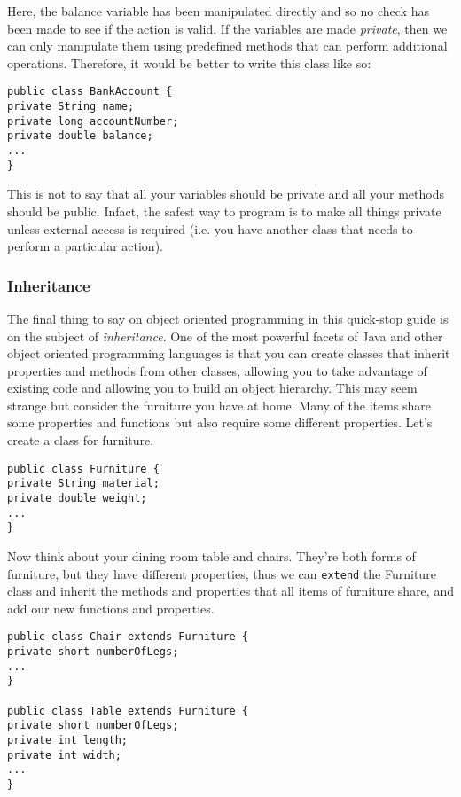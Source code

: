 \noindent
Here, the balance variable has been manipulated directly and so no check has been made to see if the action is valid. If the variables are made \emph{private}, then we can only manipulate them using predefined methods that can perform additional operations. Therefore, it would be better to write this class like so:

\begin{verbatim}
public class BankAccount {
private String name;
private long accountNumber;
private double balance;
...
}
\end{verbatim}

\noindent
This is not to say that all your variables should be private and all your methods should be public. Infact, the safest way to program is to make all things private unless external access is required (i.e. you have another class that needs to perform a particular action).

\subsubsection*{Inheritance}

The final thing to say on object oriented programming in this quick-stop guide is on the subject of \emph{inheritance}. One of the most powerful facets of Java and other object oriented programming languages is that you can create classes that inherit properties and methods from other classes, allowing you to take advantage of existing code and allowing you to build an object hierarchy. This may seem strange but consider the furniture you have at home. Many of the items share some properties and functions but also require some different properties. Let's create a class for furniture.

\begin{verbatim}
public class Furniture {
private String material;
private double weight;
...
}
\end{verbatim}

\noindent
Now think about your dining room table and chairs. They're both forms of furniture, but they have different properties, thus we can {\tt extend} the Furniture class and inherit the methods and properties that all items of furniture share, and add our new functions and properties.

\begin{verbatim}
public class Chair extends Furniture {
private short numberOfLegs;
...
}

public class Table extends Furniture {
private short numberOfLegs;
private int length;
private int width;
...
}
\end{verbatim}

